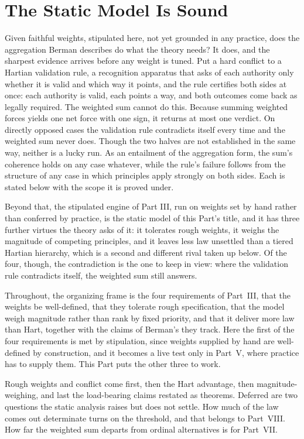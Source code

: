 \section{The Static Model Is Sound}

Given faithful weights, stipulated here, not yet grounded in any
practice, does the aggregation Berman describes do what the theory needs?
It does, and the sharpest evidence arrives before any weight is tuned. Put a hard conflict to a Hartian validation rule, a recognition apparatus that
asks of each authority only whether it is valid and which way it points, and
the rule certifies both sides at once: each authority is valid, each points a
way, and both outcomes come back as legally required. The weighted sum
cannot do this. Because summing weighted forces yields one net force with one sign, it
returns at most one verdict. On directly opposed cases the validation rule contradicts itself every time
and the weighted sum never does. Though the two halves are not established in
the same way, neither is a lucky run. As an entailment of the
aggregation form, the sum's coherence holds on any case whatever, while the
rule's failure follows from the structure of any case in which principles
apply strongly on both sides. Each is stated below with the scope it is
proved under.

Beyond that, the stipulated engine of Part III, run on weights set by hand
rather than conferred by practice, is the static model of this Part's title,
and it has three further virtues the theory asks of it: it tolerates rough weights, it weighs the magnitude of competing principles,
and it leaves less law unsettled than a tiered Hartian hierarchy, which is a
second and different rival taken up below. Of the four, though, the contradiction is the one to keep in view: where
the validation rule contradicts itself, the weighted sum still answers.

Throughout, the organizing frame is the four requirements of Part~III, that
the weights be well-defined, that they tolerate rough specification, that
the model weigh magnitude rather than rank by fixed priority, and that it
deliver more law than Hart, together with the claims of Berman's they track.
Here the first of the four requirements is met by stipulation, since weights
supplied by hand are well-defined by construction, and it becomes a live test
only in Part~V, where practice has to supply them. This Part puts the other
three to work.

Rough weights and conflict come first, then the Hart advantage, then
magnitude-weighing, and last the load-bearing claims restated as theorems.
Deferred are two questions the static analysis raises but does not settle.
How much of the law comes out determinate turns on the threshold, and that
belongs to Part~VIII. How far the weighted sum departs from ordinal
alternatives is for Part~VII.

